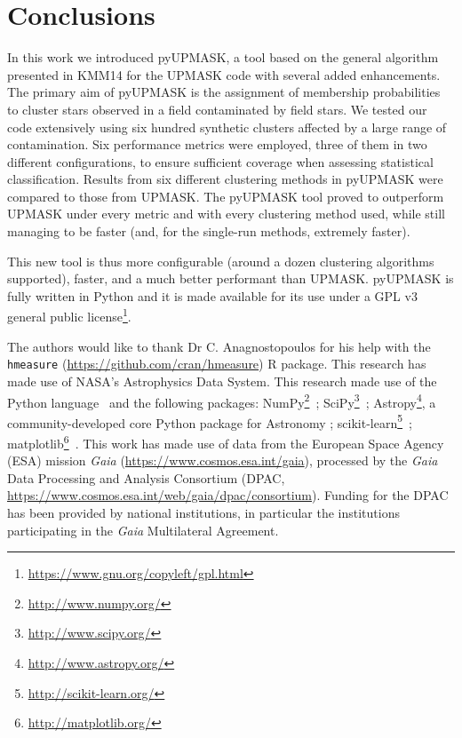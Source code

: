 \documentclass{aa}
\begin{document}
\section{Conclusions}
 \label{sec:conclusions}

 In this work we introduced pyUPMASK, a tool based on the general algorithm
 presented in KMM14 for the UPMASK code with several added enhancements.
 The primary aim of pyUPMASK is the
 assignment of membership probabilities to cluster stars observed in a field
 contaminated by field stars.
 We tested our code extensively using six hundred synthetic clusters affected
 by a large range of contamination. Six performance metrics were employed,
 three of them in two different configurations, to ensure sufficient coverage
 when assessing statistical classification.
 Results from six different clustering methods in pyUPMASK were compared to
 those from UPMASK. The pyUPMASK tool proved to outperform UPMASK under every
 metric and with every clustering method used, while still managing to be
 faster (and, for the single-run methods, extremely faster).

 This new tool is thus more configurable (around a dozen clustering
 algorithms supported), faster, and a much better performant than UPMASK.
 pyUPMASK is fully written in Python and it is made available for its use
 under a GPL v3 general public
 license\footnote{\url{https://www.gnu.org/copyleft/gpl.html}}.






\begin{acknowledgements}
The authors would like to thank Dr C. Anagnostopoulos for his help with the
\texttt{hmeasure} (\url{https://github.com/cran/hmeasure}) R package.
%
This research has made use of NASA's Astrophysics Data System.
%
This research made use of the Python language~\citep{vanRossum_1995}
and the following packages:
NumPy\footnote{\url{http://www.numpy.org/}}~\citep{vanDerWalt_2011};
SciPy\footnote{\url{http://www.scipy.org/}}~\citep{Jones_2001};
Astropy\footnote{\url{http://www.astropy.org/}}, a community-developed core Python
package for Astronomy \citep{astropy:2013,astropy:2018};
scikit-learn\footnote{\url{http://scikit-learn.org/}}~\citep{pedregosa_2011};
matplotlib\footnote{\url{http://matplotlib.org/}}~\citep{hunter_2007}.
%
This work has made use of data from the European Space Agency (ESA) mission
{\it Gaia} (\url{https://www.cosmos.esa.int/gaia}), processed by the {\it Gaia}
Data Processing and Analysis Consortium (DPAC,
\url{https://www.cosmos.esa.int/web/gaia/dpac/consortium}). Funding for the DPAC
has been provided by national institutions, in particular the institutions
participating in the {\it Gaia} Multilateral Agreement.
\end{acknowledgements}
\end{document}
